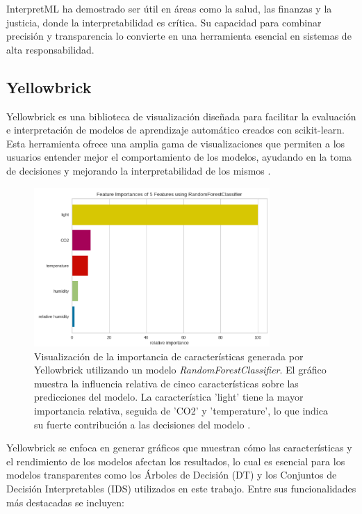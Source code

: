 InterpretML ha demostrado ser útil en áreas como la salud, las finanzas y la justicia, donde la interpretabilidad es crítica. Su capacidad para combinar precisión y transparencia lo convierte en una herramienta esencial en sistemas de alta responsabilidad.

\subsection{Yellowbrick}

Yellowbrick es una biblioteca de visualización diseñada para facilitar la evaluación e interpretación de modelos de aprendizaje automático creados con scikit-learn. Esta herramienta ofrece una amplia gama de visualizaciones que permiten a los usuarios entender mejor el comportamiento de los modelos, ayudando en la toma de decisiones y mejorando la interpretabilidad de los mismos \cite{bengfort_yellowbrick_2018}.

\begin{figure}[H]
        \centering
        \includegraphics[width=0.8\textwidth]{include/yellowbrick.png}
        \caption{Visualización de la importancia de características generada por Yellowbrick utilizando un modelo \textit{RandomForestClassifier}. El gráfico muestra la influencia relativa de cinco características sobre las predicciones del modelo. La característica 'light' tiene la mayor importancia relativa, seguida de 'CO2' y 'temperature', lo que indica su fuerte contribución a las decisiones del modelo \cite{bengfort_yellowbrick_2018}.}
        \label{fig:yellowbrick_importance}
    \end{figure}

Yellowbrick se enfoca en generar gráficos que muestran cómo las características y el rendimiento de los modelos afectan los resultados, lo cual es esencial para los modelos transparentes como los Árboles de Decisión (DT) y los Conjuntos de Decisión Interpretables (IDS) utilizados en este trabajo. Entre sus funcionalidades más destacadas se incluyen:

